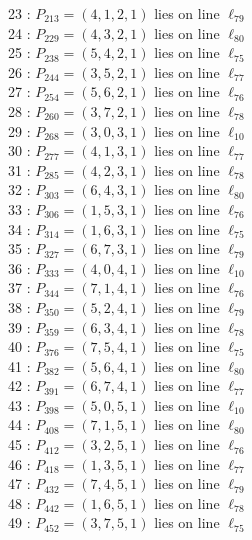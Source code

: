 \documentclass{article}
\begin{document}
{\begin{multicols}{2}
23 : $P_{213}=( 4, 1, 2, 1 )$ lies on line $\ell_{79}$\\
24 : $P_{229}=( 4, 3, 2, 1 )$ lies on line $\ell_{80}$\\
25 : $P_{238}=( 5, 4, 2, 1 )$ lies on line $\ell_{75}$\\
26 : $P_{244}=( 3, 5, 2, 1 )$ lies on line $\ell_{77}$\\
27 : $P_{254}=( 5, 6, 2, 1 )$ lies on line $\ell_{76}$\\
28 : $P_{260}=( 3, 7, 2, 1 )$ lies on line $\ell_{78}$\\
29 : $P_{268}=( 3, 0, 3, 1 )$ lies on line $\ell_{10}$\\
30 : $P_{277}=( 4, 1, 3, 1 )$ lies on line $\ell_{77}$\\
31 : $P_{285}=( 4, 2, 3, 1 )$ lies on line $\ell_{78}$\\
32 : $P_{303}=( 6, 4, 3, 1 )$ lies on line $\ell_{80}$\\
33 : $P_{306}=( 1, 5, 3, 1 )$ lies on line $\ell_{76}$\\
34 : $P_{314}=( 1, 6, 3, 1 )$ lies on line $\ell_{75}$\\
35 : $P_{327}=( 6, 7, 3, 1 )$ lies on line $\ell_{79}$\\
36 : $P_{333}=( 4, 0, 4, 1 )$ lies on line $\ell_{10}$\\
37 : $P_{344}=( 7, 1, 4, 1 )$ lies on line $\ell_{76}$\\
38 : $P_{350}=( 5, 2, 4, 1 )$ lies on line $\ell_{79}$\\
39 : $P_{359}=( 6, 3, 4, 1 )$ lies on line $\ell_{78}$\\
40 : $P_{376}=( 7, 5, 4, 1 )$ lies on line $\ell_{75}$\\
41 : $P_{382}=( 5, 6, 4, 1 )$ lies on line $\ell_{80}$\\
42 : $P_{391}=( 6, 7, 4, 1 )$ lies on line $\ell_{77}$\\
43 : $P_{398}=( 5, 0, 5, 1 )$ lies on line $\ell_{10}$\\
44 : $P_{408}=( 7, 1, 5, 1 )$ lies on line $\ell_{80}$\\
45 : $P_{412}=( 3, 2, 5, 1 )$ lies on line $\ell_{76}$\\
46 : $P_{418}=( 1, 3, 5, 1 )$ lies on line $\ell_{77}$\\
47 : $P_{432}=( 7, 4, 5, 1 )$ lies on line $\ell_{79}$\\
48 : $P_{442}=( 1, 6, 5, 1 )$ lies on line $\ell_{78}$\\
49 : $P_{452}=( 3, 7, 5, 1 )$ lies on line $\ell_{75}$\\

\end{multicols}}
\end{document}
